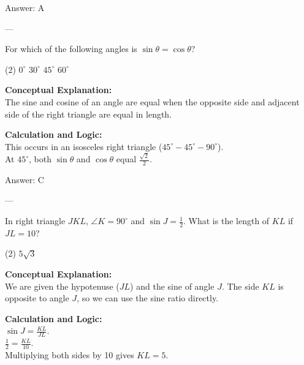 \documentclass[11pt,paper=a4,answers]{exam}
\begin{document}
\begin{questions}
\begin{solution}
\vspace{15pt}
Answer: \colorbox{yellow!100}{A}
\end{solution}

---

\question
For which of the following angles is $\sin \theta = \cos \theta$?
\begin{tasks}(2)
    \task $0^\circ$
    \task $30^\circ$
    \task $45^\circ$
    \task $60^\circ$
\end{tasks}

\begin{solution}
\textbf{Conceptual Explanation:} \\
The sine and cosine of an angle are equal when the opposite side and adjacent side of the right triangle are equal in length.

\vspace{10pt}
\textbf{Calculation and Logic:} \\
This occurs in an isosceles right triangle ($45^\circ-45^\circ-90^\circ$). \\
At $45^\circ$, both $\sin \theta$ and $\cos \theta$ equal $\frac{\sqrt{2}}{2}$.

\vspace{15pt}
Answer: \colorbox{yellow!100}{C}
\end{solution}

---

\question
In right triangle $JKL$, $\angle K = 90^\circ$ and $\sin J = \frac{1}{2}$. What is the length of $KL$ if $JL = 10$?
\begin{tasks}(2)
    \task $5\sqrt{3}$
\end{tasks}

\begin{solution}
\textbf{Conceptual Explanation:} \\
We are given the hypotenuse ($JL$) and the sine of angle $J$. The side $KL$ is opposite to angle $J$, so we can use the sine ratio directly.

\vspace{10pt}
\textbf{Calculation and Logic:} \\
$\sin J = \frac{KL}{JL}$. \\
$\frac{1}{2} = \frac{KL}{10}$. \\
Multiplying both sides by 10 gives $KL = 5$.


\end{solution}
\end{questions}
\end{document}
